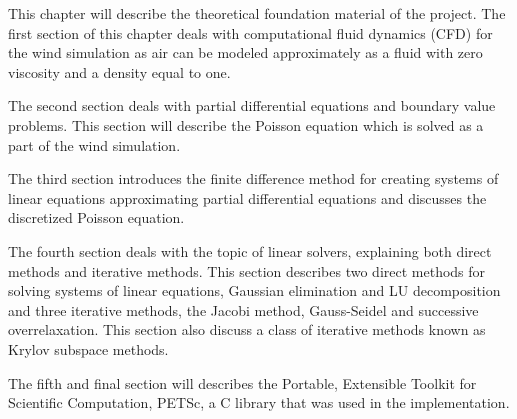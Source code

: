 This chapter will describe the theoretical foundation material of the project. 
The first section of this chapter deals with computational fluid dynamics (CFD) 
for the wind simulation as air can be modeled approximately as a fluid with 
zero viscosity and a density equal to one\cite{originalSnowThesis}.

The second section deals with partial differential equations and boundary value
problems. This section will describe the Poisson equation which is solved as a 
part of the wind simulation.

The third section introduces the finite difference method for creating systems of
linear equations approximating partial differential equations and discusses
the discretized Poisson equation.

The fourth section deals with the topic of linear solvers, explaining both direct
methods and iterative methods. This section describes two direct
methods for solving systems of linear equations, Gaussian elimination and LU
decomposition and three iterative methods, the Jacobi method, Gauss-Seidel and
successive overrelaxation. This section also discuss a class of iterative methods 
known as Krylov subspace methods. 

The fifth and final section will describes the Portable, Extensible Toolkit for
Scientific Computation, PETSc, a C library that was used in the implementation.
